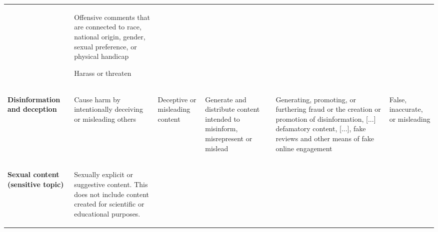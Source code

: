 {\begin{longtable}{p{6em}p{6em}p{6em}p{6em}p{6em}p{6em}}
\begin{balditemize}[noitemsep, topsep=0pt]
	\end{balditemize}
   &
   \begin{balditemize}[noitemsep, topsep=0pt]
   	\item Offensive comments that are connected to race, national origin, gender, sexual preference, or physical handicap
   	\item Harass or threaten
   \end{balditemize}
 \\
 \begin{balditemize}[noitemsep, topsep=0pt]
	\item \textbf{Disinformation} \textbf{and deception}
	\end{balditemize}
 &
\begin{balditemize}[noitemsep, topsep=0pt]
	\item   Cause harm by intentionally deceiving or misleading others
\end{balditemize}
 &
 \begin{balditemize}[noitemsep, topsep=0pt]
 	\item Deceptive or misleading content
 \end{balditemize}
   &
   \begin{balditemize}[noitemsep, topsep=0pt]
   	\item Generate and distribute content intended to misinform, misrepresent or mislead
   \end{balditemize}
   &
   \begin{balditemize}[noitemsep, topsep=0pt]
   	\item Generating, promoting, or furthering fraud or the creation or promotion of disinformation, {[}...{]} defamatory content, {[}...{]}, fake reviews and other means of fake online engagement
   \end{balditemize}
  &
  \begin{balditemize}[noitemsep, topsep=0pt]
  	\item False, inaccurate, or misleading
  \end{balditemize}
\\   
 \begin{balditemize}[noitemsep, topsep=0pt]
	\item  \textbf{Sexual content}  \textbf{(sensitive topic)}
	\end{balditemize} &
\begin{balditemize}[noitemsep, topsep=0pt]
	\item   Sexually explicit or suggestive content. This does not include content created for scientific or educational purposes.

\end{balditemize}
\end{longtable}}
